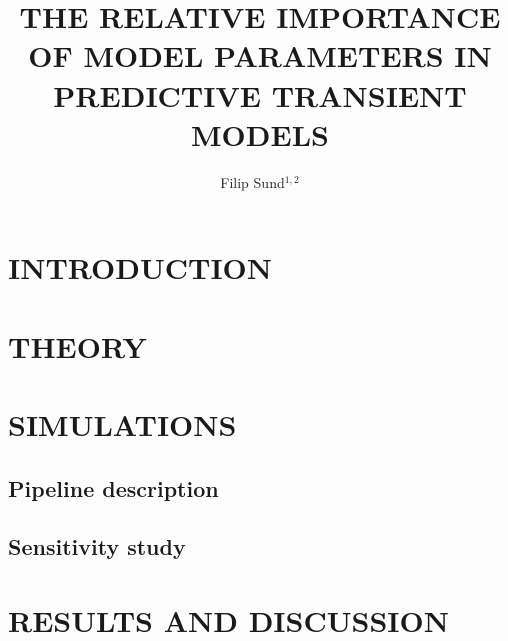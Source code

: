 \documentclass{mekit17}
\title{THE RELATIVE IMPORTANCE OF MODEL PARAMETERS IN PREDICTIVE TRANSIENT MODELS}
\author{Filip Sund$^{1,2}$}
\begin{document}



\section{INTRODUCTION}


\section{THEORY}
\label{theory}


\section{SIMULATIONS}
\label{simulations}
\subsection{Pipeline description}
\label{subsec:pipeline}

\subsection{Sensitivity study}


\section{RESULTS AND DISCUSSION}
\label{results}

\end{document}

